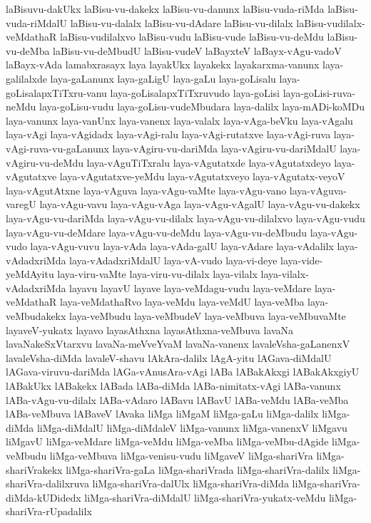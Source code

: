 {laBisuvu-dakUkx
laBisu-vu-dakekx
laBisu-vu-danunx
laBisu-vuda-riMda
laBisu-vuda-riMdalU
laBisu-vu-dalalx
laBisu-vu-dAdare
laBisu-vu-dilalx
laBisu-vudilalx-veMdathaR
laBisu-vudilalxvo
laBisu-vudu
laBisu-vude
laBisu-vu-deMdu
laBisu-vu-deMba
laBisu-vu-deMbudU
laBisu-vudeV
laBayxteV
laBayx-vAgu-vadoV
laBayx-vAda
lamabxrasayx
laya
layakUkx
layakekx
layakarxma-vanunx
laya-galilalxde
laya-gaLanunx
laya-gaLigU
laya-gaLu
laya-goLisalu
laya-goLisalapxTiTxru-vanu
laya-goLisalapxTiTxruvudo
laya-goLisi
laya-goLisi-ruva-neMdu
laya-goLisu-vudu
laya-goLisu-vudeMbudara
laya-dalilx
laya-mADi-koMDu
laya-vanunx
laya-vanUnx
laya-vanenx
laya-valalx
laya-vAga-beVku
laya-vAgalu
laya-vAgi
laya-vAgidadx
laya-vAgi-ralu
laya-vAgi-rutatxve
laya-vAgi-ruva
laya-vAgi-ruva-vu-gaLanunx
laya-vAgiru-vu-dariMda
laya-vAgiru-vu-dariMdalU
laya-vAgiru-vu-deMdu
laya-vAguTiTxralu
laya-vAgutatxde
laya-vAgutatxdeyo
laya-vAgutatxve
laya-vAgutatxve-yeMdu
laya-vAgutatxveyo
laya-vAgutatx-veyoV
laya-vAgutAtxne
laya-vAguva
laya-vAgu-vaMte
laya-vAgu-vano
laya-vAguva-varegU
laya-vAgu-vavu
laya-vAgu-vAga
laya-vAgu-vAgalU
laya-vAgu-vu-dakekx
laya-vAgu-vu-dariMda
laya-vAgu-vu-dilalx
laya-vAgu-vu-dilalxvo
laya-vAgu-vudu
laya-vAgu-vu-deMdare
laya-vAgu-vu-deMdu
laya-vAgu-vu-deMbudu
laya-vAgu-vudo
laya-vAgu-vuvu
laya-vAda
laya-vAda-galU
laya-vAdare
laya-vAdalilx
laya-vAdadxriMda
laya-vAdadxriMdalU
laya-vA-vudo
laya-vi-deye
laya-vide-yeMdAyitu
laya-viru-vaMte
laya-viru-vu-dilalx
laya-vilalx
laya-vilalx-vAdadxriMda
layavu
layavU
layave
laya-veMdagu-vudu
laya-veMdare
laya-veMdathaR
laya-veMdathaRvo
laya-veMdu
laya-veMdU
laya-veMba
laya-veMbudakekx
laya-veMbudu
laya-veMbudeV
laya-veMbuva
laya-veMbuvaMte
layaveV-yukatx
layavo
layasAthxna
layasAthxna-veMbuva
lavaNa
lavaNakeSxVtarxvu
lavaNa-meVveYvaM
lavaNa-vanenx
lavaleVsha-gaLanenxV
lavaleVsha-diMda
lavaleV-shavu
lAkAra-dalilx
lAgA-yitu
lAGava-diMdalU
lAGava-viruvu-dariMda
lAGa-vAnusAra-vAgi
lABa
lABakAkxgi
lABakAkxgiyU
lABakUkx
lABakekx
lABada
lABa-diMda
lABa-nimitatx-vAgi
lABa-vanunx
lABa-vAgu-vu-dilalx
lABa-vAdaro
lABavu
lABavU
lABa-veMdu
lABa-veMba
lABa-veMbuva
lABaveV
lAvaka
liMga
liMgaM
liMga-gaLu
liMga-dalilx
liMga-diMda
liMga-diMdalU
liMga-diMdaleV
liMga-vanunx
liMga-vanenxV
liMgavu
liMgavU
liMga-veMdare
liMga-veMdu
liMga-veMba
liMga-veMbu-dAgide
liMga-veMbudu
liMga-veMbuva
liMga-venisu-vudu
liMgaveV
liMga-shariVra
liMga-shariVrakekx
liMga-shariVra-gaLa
liMga-shariVrada
liMga-shariVra-dalilx
liMga-shariVra-dalilxruva
liMga-shariVra-dalUlx
liMga-shariVra-diMda
liMga-shariVra-diMda-kUDidedx
liMga-shariVra-diMdalU
liMga-shariVra-yukatx-veMdu
liMga-shariVra-rUpadalilx
}
